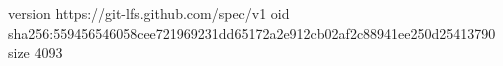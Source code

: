 version https://git-lfs.github.com/spec/v1
oid sha256:559456546058cee721969231dd65172a2e912cb02af2c88941ee250d25413790
size 4093
